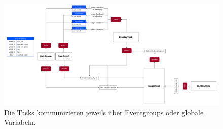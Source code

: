 \documentclass[ngerman,10pt,a4paper,titlepage]{report}
\begin{document}
	\begin{figure}
		\centering
		\includegraphics[width=1\linewidth]{diagrams/TaskOverview}
		\caption[Taskübersicht]{Die Tasks kommunizieren jeweils über Eventgroups oder globale Variabeln.}
		\label{fig:taskoverview}
	\end{figure}
\end{document}
